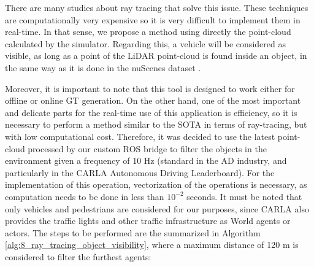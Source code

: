 There are many studies about ray tracing that solve this issue. These techniques \cite{raytracing1, raytracing2} are computationally very expensive so it is very difficult to implement them in real-time. In that sense, we propose a method using directly the point-cloud calculated by the simulator. Regarding this, a vehicle will be considered as visible, as long as a point of the LiDAR point-cloud is found inside an object, in the same way as it is done in the nuScenes dataset \cite{caesar2020nuscenes}. 

Moreover, it is important to note that this tool is designed to work either for offline or online \ac{GT} generation. On the other hand, one of the most important and delicate parts for the real-time use of this application is efficiency, so it is necessary to perform a method similar to the \ac{SOTA} in terms of ray-tracing, but with low computational cost. Therefore, it was decided to use the latest point-cloud processed by our custom \ac{ROS} bridge to filter the objects in the environment given a frequency of 10 Hz (standard in the \ac{AD} industry, and particularly in the \ac{CARLA} Autonomous Driving Leaderboard). For the implementation of this operation, vectorization of the operations is necessary, as computation needs to be done in less than $10^{-2}$ seconds. It must be noted that only vehicles and pedestrians are considered for our purposes, since \ac{CARLA} also provides the traffic lights and other traffic infrastructure as World agents or actors. The steps to be performed are the summarized in Algorithm \ref{alg:8_ray_tracing_object_visibility}, where a maximum distance of 120 m is considered to filter the furthest agents:

